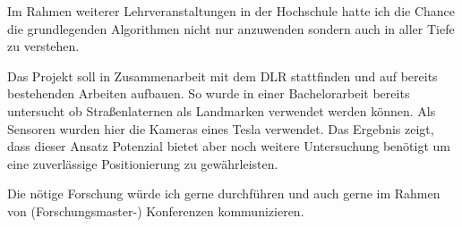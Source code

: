 Im Rahmen weiterer Lehrveranstaltungen in der Hochschule hatte ich die Chance die grundlegenden Algorithmen nicht nur anzuwenden sondern auch in aller Tiefe zu verstehen.

Das Projekt soll in Zusammenarbeit mit dem DLR stattfinden und auf bereits bestehenden Arbeiten aufbauen. So wurde in einer Bachelorarbeit bereits untersucht ob Straßenlaternen als Landmarken verwendet werden können. Als Sensoren wurden hier die Kameras eines Tesla verwendet. Das Ergebnis zeigt, dass dieser Ansatz Potenzial bietet aber noch weitere Untersuchung benötigt um eine zuverlässige Positionierung zu gewährleisten.

Die nötige Forschung würde ich gerne durchführen und auch gerne im Rahmen von (Forschungsmaster-) Konferenzen kommunizieren.
